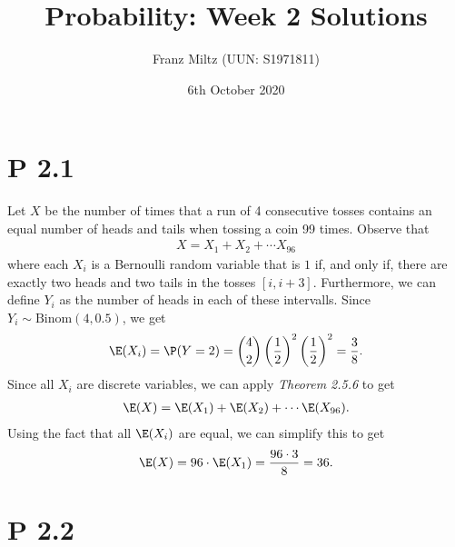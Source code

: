 \documentclass{article}
\begin{document}
\title{Probability: Week 2 Solutions}
\author{Franz Miltz (UUN: S1971811)}
\date{6th October 2020}
\maketitle


\section*{P 2.1}


Let $X$ be the number of times that a run of 4 consecutive tosses
contains an equal number of heads and tails when tossing a coin 99 times.
Observe that
\begin{align*}
	X=X_1 + X_2 + \cdots X_{96}
\end{align*}
where each $X_i$ is a Bernoulli random variable that is $1$ if,
and only if, there are exactly two heads and two tails in the tosses
$[i, i+3]$. Furthermore, we can define $Y_i$ as the number of heads
in each of these intervalls. Since $Y_i\sim \text{Binom}(4,0.5)$,
we get
\begin{align*}
	\E(X_i) = \P(Y=2) = \binom{4}{2}\left(\frac{1}{2}\right)^2\left(\frac{1}{2}\right)^2=\frac{3}{8}.
\end{align*}
Since all $X_i$ are discrete variables, we can apply \emph{Theorem 2.5.6}
to get
\begin{align*}
	\E(X) = \E(X_1) + \E(X_2) + \cdots \E(X_{96}).
\end{align*}
Using the fact that all $\E(X_i)$ are equal, we can simplify this to get
\begin{align*}
	\E(X) = 96\cdot\E(X_1) = \frac{96\cdot3}{8}=36.
\end{align*}


\section*{P 2.2}
\end{document}

